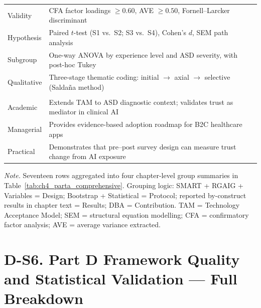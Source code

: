 {\begin{xltabular}{\textwidth}{@{} >{\raggedright\arraybackslash}p{2.5cm} L @{}}
Validity & CFA factor loadings $\geq 0.60$, AVE $\geq 0.50$, Fornell--Larcker discriminant \\
Hypothesis & Paired $t$-test (S1 vs.\ S2; S3 vs.\ S4), Cohen's $d$, SEM path analysis \\
Subgroup & One-way ANOVA by experience level and ASD severity, with post-hoc Tukey \\
Qualitative & Three-stage thematic coding: initial $\to$ axial $\to$ selective (Salda\~{n}a method) \\
\midrule
{} \\
\addlinespace
Academic & Extends TAM to ASD diagnostic context; validates trust as mediator in clinical AI \\
Managerial & Provides evidence-based adoption roadmap for B2C healthcare apps \\
Practical & Demonstrates that pre--post survey design can measure trust change from AI exposure \\
\end{xltabular}}
\vspace{0.4em}
\noindent\textit{Note.} Seventeen rows aggregated into four chapter-level group summaries in Table~\ref{tab:ch4_parta_comprehensive}. Grouping logic: SMART + RGAIG + Variables = Design; Bootstrap + Statistical = Protocol; reported by-construct results in chapter text = Results; DBA = Contribution. TAM = Technology Acceptance Model; SEM = structural equation modelling; CFA = confirmatory factor analysis; AVE = average variance extracted.

\section*{D-S6. Part D Framework Quality and Statistical Validation --- Full Breakdown}
\label{sec:appd_partd_framework_quality_full}

